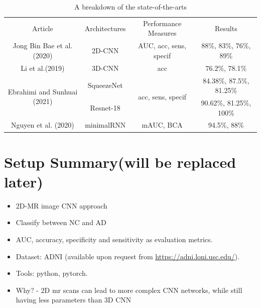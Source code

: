 \documentclass[a4paper, 12pt]{article}
\begin{document}
\begin{table}[htbp]
    \centering
    \footnotesize
    \begin{tabular}{cccc}
        \toprule
        \multirow{2}{*}{Article}                     & \multirow{2}{*}{Architectures} & \multirow{2}{*}{Performance Measures} & \multirow{2}{*}{Results}        \\
                                                     &                                &                                       &                                 \\
        \midrule
        Jong Bin Bae et al.(2020)                    & 2D-CNN                         & AUC, acc, sens, specif                & \tiny{88\%, 83\%, 76\%, 89\%}   \\
        \midrule
        Li et al.(2019)                              & 3D-CNN                         & acc                                   & \footnotesize{76.2\%, 78.1\%}   \\
        \midrule
        \multirow{2}{*}{Ebrahimi and Sunhuai (2021)} & SqueezeNet                     & \multirow{2}{*}{acc, sens, specif}    & \tiny{84.38\%, 87.5\%, 81.25\%} \\
                                                     & Resnet-18                      &                                       & \tiny{90.62\%, 81.25\%, 100\%}  \\
        \midrule
        Nguyen et al. (2020)                         & minimalRNN                     & mAUC, BCA                             & \footnotesize{94.5\%, 88\%}     \\
        \bottomrule
    \end{tabular}
    \caption{A breakdown of the state-of-the-arts}
    \label{tab:mytable}
\end{table}

\newpage
\section{Setup Summary(will be replaced later)}
\begin{itemize}
    \item 2D-MR image CNN approach
    \item Classify between NC and AD
    \item AUC, accuracy, specificity and sensitivity as evaluation metrics.
    \item Dataset: ADNI (available upon request from \url{https://adni.loni.usc.edu/}).
    \item Tools: python, pytorch.
    \item Why? - 2D mr scans can lead to more complex CNN networks, while still having less parameters than 3D CNN
\end{itemize}
\end{document}
